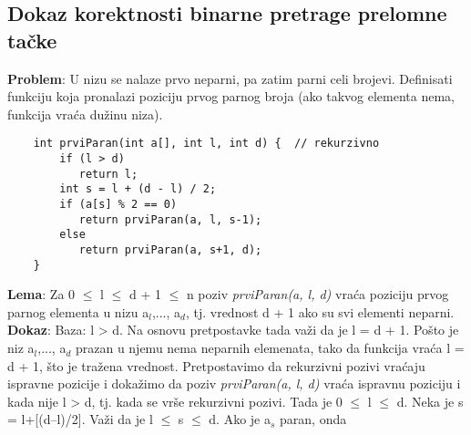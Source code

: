 \documentclass{article}
\begin{document}
\subsection{Dokaz korektnosti binarne pretrage prelomne tačke}
\textbf{Problem}: U nizu se nalaze prvo neparni, pa zatim parni celi brojevi. Definisati funkciju koja pronalazi poziciju prvog parnog broja (ako takvog elementa nema, funkcija vraća dužinu niza).
\begin{lstlisting}
    int prviParan(int a[], int l, int d) {  // rekurzivno
		if (l > d) 
		   return l; 
		int s = l + (d - l) / 2; 
		if (a[s] % 2 == 0) 
		   return prviParan(a, l, s-1); 
		else
		   return prviParan(a, s+1, d); 
	} 
\end{lstlisting}
\textbf{Lema}: Za 0 $\leq$ l $\leq$ d + 1 $\leq$ n poziv \textit{prviParan(a, l, d)} vraća poziciju prvog parnog elementa u nizu a$_l$,..., a$_d$, tj. vrednost d + 1 ako su svi elementi neparni.
\hspace*{0.4cm}\textbf{Dokaz}:
\newline \hspace*{0.8cm}Baza:  l > d. Na osnovu pretpostavke tada važi da je l = d + 1. Pošto je \hspace*{0.8cm}niz a$_l$,..., a$_d$ prazan u 	njemu nema neparnih elemenata, tako da funkcija \hspace*{0.8cm}vraća l = d + 1, što je tražena vrednost.
\newline \hspace*{0.8cm}Pretpostavimo da rekurzivni pozivi vraćaju ispravne pozicije i dokažimo \hspace*{0.8cm}da poziv 	\textit{prviParan(a, l, d)} vraća ispravnu poziciju i kada nije l > d, tj. \hspace*{0.8cm}kada se vrše rekurzivni 	pozivi. Tada je
0 $\leq$ l $\leq$ d. Neka je s = l+[(d–l)/2]. \hspace*{0.8cm}Važi da je l $\leq$ s $\leq$ d. Ako je a$_s$ paran, onda 
\end{document}
